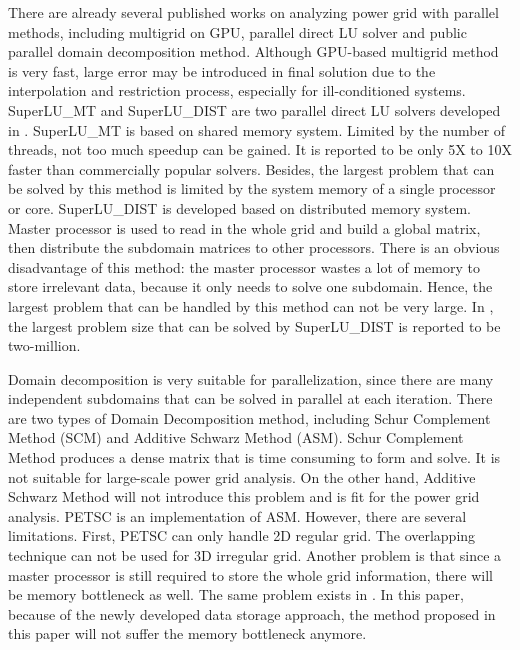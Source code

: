 \documentclass{sig-alternate}
\begin{document}
	There are already several published works on analyzing power grid with parallel methods, including multigrid on 
	GPU\cite{Zhuofeng}, parallel direct LU 
	solver\cite{Super_LU_website} and public parallel domain decomposition method\cite{PETSC_website, kaisun, voronov}. Although 
	GPU-based multigrid method\cite{Zhuofeng} is very fast, large error may be
	introduced in final solution due to the interpolation and restriction
	process, especially for ill-conditioned systems. SuperLU\_MT and SuperLU\_DIST are two parallel direct LU 
	solvers developed in \cite{Super_LU_website}. SuperLU\_MT is 
	based on shared memory system. Limited by the number of threads, not too much speedup can be gained. 
	It is reported to be only 5X to 10X faster than commercially popular solvers\cite{Super_LU_website}. Besides, the largest 
	problem that can be solved by this method is limited by the system memory of a single processor or core. SuperLU\_DIST 
	is developed based on distributed memory system. Master processor is used to read in the whole grid and build a global 
	matrix, then distribute the subdomain matrices to other processors. 
	There is an obvious disadvantage of this method: the master processor wastes a lot of memory to store irrelevant data, because 
	it only needs to solve one subdomain. Hence, the largest problem that can be handled by this method can not be very large. In 
	\cite{Super_LU_website}, the largest problem size that can be solved by SuperLU\_DIST is reported to be two-million.

	Domain decomposition is very suitable for parallelization, since there are many independent subdomains that can be
	solved in parallel at each iteration. There are two types of Domain Decomposition method, including Schur Complement Method (SCM) 
	and Additive Schwarz Method (ASM). Schur Complement Method produces a dense matrix that is time consuming to form and solve. It
	is not suitable for large-scale power grid analysis. On the other hand, Additive Schwarz Method will not introduce this problem 
	and is fit for the power grid analysis. PETSC\cite{PETSC_website} is an implementation of ASM.
	However, there are several limitations. First, PETSC can only handle 2D regular grid. 
	The overlapping technique can not be used for 3D irregular grid. Another problem is that since a master processor is 
	still required to store the whole grid information, there will be memory bottleneck as well. The same problem exists in 
	\cite{kaisun, voronov}. In this paper, because of the newly developed data storage approach, the method proposed in this paper 
	will not suffer the memory bottleneck anymore.
	
\end{document}
